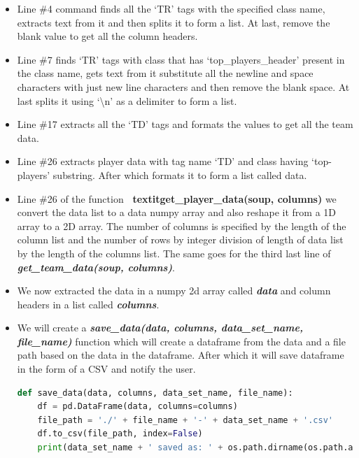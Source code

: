\documentclass[12pt]{article}
\begin{document}
\begin{itemize}
	\item Line \#4 command finds all the ‘TR’ tags with the specified class name, extracts text from it and then splits it to form a list. At last, remove the blank value to get all the column headers.
	
	\item[] Line \#7 finds ‘TR’ tags with class that has ‘top\_players\_header’ present in the class name, gets text from it substitute all the newline and space characters with just new line characters and then remove the blank space. At last splits it using ‘\textbackslash n’ as a delimiter to form a list.
	
	\item[] Line \#17 extracts all the ‘TD’ tags and formats the values to get all the team data.
	
	\item[] Line \#26 extracts player data with tag name ‘TD’ and class having ‘top-players’ substring. After which formats it to form a list called data.
	
	\item Line \#26 of the function \textbf{\ textit{get\_player\_data(soup, columns)}} we convert the data list to a data numpy array and also reshape it from a 1D array to a 2D array. The number of columns is specified by the length of the column list and the number of rows by integer division of length of data list by the length of the columns list. The same goes for the third last line of \textbf{\textit{get\_team\_data(soup, columns)}}.
	
	\item We now extracted the data in a numpy 2d array called \textbf{\textit{data}} and column headers in a list called \textbf{\textit{columns}}.
	
	\item We will create a \textbf{\textit{save\_data(data, columns, data\_set\_name, file\_name)}} function which will create a dataframe from the data and a file path based on the data in the dataframe. After which it will save dataframe in the form of a CSV and notify the user.
	\begin{lstlisting}[language=Python]
def save_data(data, columns, data_set_name, file_name):
	df = pd.DataFrame(data, columns=columns)
	file_path = './' + file_name + '-' + data_set_name + '.csv'
	df.to_csv(file_path, index=False)
	print(data_set_name + ' saved as: ' + os.path.dirname(os.path.abspath(__file__)) + '/' + data_set_name + '.csv')
	\end{lstlisting}
	

\end{itemize}
\end{document}
